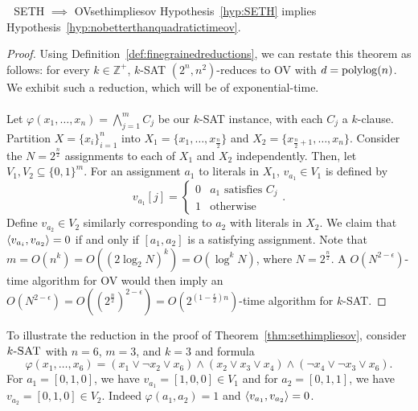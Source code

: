         \begin{theorem}{\Stop\,\,\cite{williams2005twoconstraintsat} SETH \(\implies\) OV}{sethimpliesov}
            Hypothesis~\ref{hyp:SETH} implies Hypothesis~\ref{hyp:nobetterthanquadratictimeov}.
            \begin{proof}
                Using Definition~\ref{def:finegrainedreductions}, we can restate this theorem as follows: for every \(k\in\mathbb{Z}^+\), \(k\)-\textsc{SAT} \((2^n,n^2)\)-reduces to \textsc{OV} with \(d=\operatorname{polylog}(n)\). We exhibit such a reduction, which will be of exponential-time.
                \\
                \\
                Let \(\varphi(x_1,\ldots,x_n)=\bigwedge_{j=1}^m C_j\) be our \(k\)-\textsc{SAT} instance, with each \(C_j\) a \(k\)-clause. Partition \(X=\{x_i\}_{i=1}^n\) into \(X_1=\{x_1,\ldots,x_{\frac{n}{2}}\}\) and \(X_2=\{x_{\frac{n}{2}+1},\ldots,x_n\}\). Consider the \(N=2^\frac{n}{2}\) assignments to each of \(X_1\) and \(X_2\) independently. Then, let \(V_1,V_2\subseteq\{0,1\}^m\). For an assignment \(a_1\) to literals in \(X_1\), \(v_{a_1}\in V_1\) is defined by
                \begin{equation*}
                    v_{a_1}[j]=\begin{cases}
                    0 & a_1\text{ satisfies }C_j \\
                    1 & \text{otherwise}
                    \end{cases}.
                \end{equation*}
                Define \(v_{a_2}\in V_2\) similarly corresponding to \(a_2\) with literals in \(X_2\). We claim that \(\left\langle v_{a_i},v_{a_2}\right\rangle=0\) if and only if \([a_1,a_2]\) is a satisfying assignment. Note that \(m=O(n^k)=O((2\log_2N)^k)=O(\log^kN)\), where \(N=2^\frac{n}{2}\). A \(O\left(N^{2-\epsilon}\right)\)-time algorithm for \textsc{OV} would then imply an \(O\left(N^{2-\epsilon}\right)=O\left(\left(2^\frac{n}{2}\right)^{2-\epsilon}\right)=O\left(2^{\left(1-\frac{\epsilon}{2}\right)n}\right)\)-time algorithm for \(k\)-\textsc{SAT}. 
            \end{proof}
        \end{theorem}
        \begin{example}
            To illustrate the reduction in the proof of Theorem~\ref{thm:sethimpliesov}, consider \(k\textsc{-SAT}\) with \(n=6\), \(m=3\), and \(k=3\) and formula
            \begin{equation*}
                \varphi(x_1,\ldots,x_6)=(x_1\vee\neg x_2\vee x_6)\wedge(x_2\vee x_3\vee x_4)\wedge (\neg x_4\vee \neg x_3\vee x_6).
            \end{equation*}
            For \(a_1=[0,1,0]\), we have \(v_{a_1}=[1,0,0]\in V_1\) and for \(a_2=[0,1,1]\), we have \(v_{a_2}=[0,1,0]\in V_2\). Indeed \(\varphi(a_1,a_2)=1\) and \(\left\langle v_{a_1},v_{a_2}\right\rangle=0\).
        \end{example}

